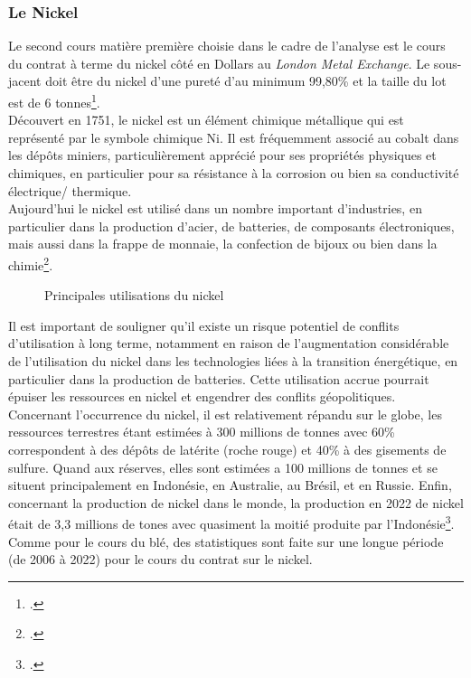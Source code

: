 \subsubsection{Le Nickel}
Le second cours matière première choisie dans le cadre de l'analyse est le cours du contrat à terme du nickel côté en Dollars au \textit{London Metal Exchange}. Le 
sous-jacent doit être du nickel d'une pureté d'au minimum 99,80\% et la taille du lot est de 6 tonnes\footcite{lme_nickel}.\\[11pt]
Découvert en 1751, le nickel est un élément chimique métallique qui est représenté par le symbole chimique Ni. Il est fréquemment associé au cobalt dans les dépôts 
miniers, particulièrement apprécié pour ses propriétés physiques et chimiques, en particulier pour sa résistance à la corrosion ou bien sa conductivité électrique/
thermique. \\[11pt]
Aujourd'hui le nickel est utilisé dans un nombre important d'industries, en particulier dans la production  
d'acier, de batteries, de composants électroniques, mais aussi dans la frappe de monnaie, la confection de bijoux ou bien dans la chimie\footcite{about_nickel}.
\begin{figure}[H]
    \centering
    \resizebox{0.8\textwidth}{!}{}
    \caption{Principales utilisations du nickel}
\end{figure}
Il est important de souligner qu'il existe un risque potentiel de conflits d'utilisation à long terme, notamment en raison de l'augmentation considérable de l'utilisation 
du nickel dans les technologies liées à la transition énergétique, en particulier dans la production de batteries. Cette utilisation accrue pourrait épuiser les ressources 
en nickel et engendrer des conflits géopolitiques.\\[11pt]
Concernant l'occurrence du nickel, il est relativement répandu sur le globe, les ressources terrestres étant estimées à 300 millions de tonnes avec 60\% correspondent à 
des dépôts de latérite (roche rouge) et 40\% à des gisements de sulfure. Quand aux réserves, elles sont estimées a 100 millions de tonnes et se 
situent principalement en Indonésie, en Australie, au Brésil, et en Russie. Enfin, concernant la production de nickel dans le monde, la production en 2022 de nickel était
de 3,3 millions de tones avec quasiment la moitié produite par l'Indonésie\footcite{info_nickel}.\\[11pt]
Comme pour le cours du blé, des statistiques sont faite sur une longue période (de 2006 à 2022) pour le cours du contrat sur le nickel.
